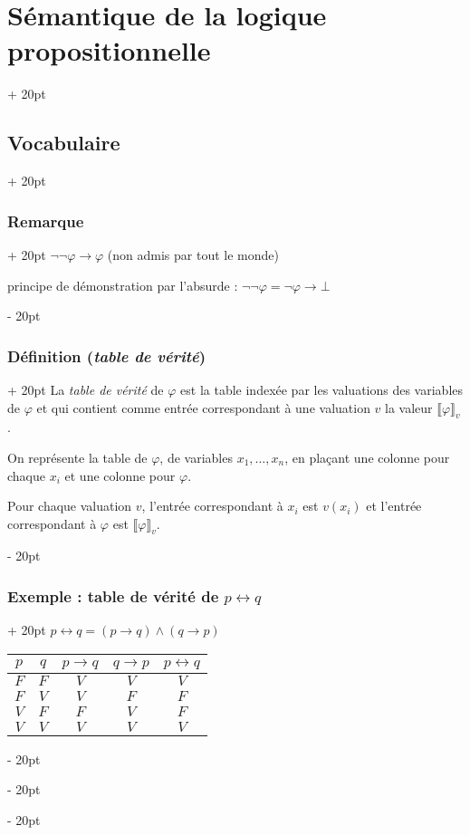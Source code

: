 \documentclass[a4paper, 12pt, twoside]{article}
\newcommand{\ind}[1][20pt]{\advance\leftskip + #1}
\newcommand{\deind}[1][20pt]{\advance\leftskip - #1}
\newenvironment{indt}[2][20pt]{#2 \par \ind[#1]}{\par \deind} %
\begin{document}
\begin{indt}{\section{Sémantique de la logique propositionnelle}}
\begin{indt}{\subsection{Vocabulaire}}
\begin{indt}{\subsubsection{Remarque}}
                $\neg \neg \varphi \rightarrow \varphi$ (non admis par tout le monde)
                
                principe de démonstration par l'absurde : $\neg \neg \varphi = \neg \varphi \rightarrow \bot$
            \end{indt}
            
            \vspace{12pt}
            
            \begin{indt}{\subsubsection{Définition (\textit{table de vérité})}}
                La \textit{table de vérité} de $\varphi$ est la table indexée par les valuations des variables de $\varphi$ et qui contient comme entrée correspondant à une valuation $v$ la valeur $\llbracket \varphi \rrbracket_v$.
                
                On représente la table de $\varphi$, de variables $x_1, \ldots, x_n$, en plaçant une colonne pour chaque $x_i$ et une colonne pour $\varphi$.
                
                Pour chaque valuation $v$, l'entrée correspondant à $x_i$ est $v(x_i)$ et l'entrée correspondant à $\varphi$ est $\llbracket \varphi \rrbracket_v$.
            \end{indt}
            
            \vspace{12pt}
            
            \begin{indt}{\subsubsection{Exemple : table de vérité de $p \leftrightarrow q$}}
                $p \leftrightarrow q = (p \rightarrow q) \wedge (q \rightarrow p)$
                
                \begin{tabular}{c|c|c|c|c}
                    $p$ & $q$ & $p \rightarrow q$ & $q \rightarrow p$ & $p \leftrightarrow q$
                    \\
                    \hline
                    $F$ & $F$ & $V$ & $V$ & $V$
                    \\
                    $F$ & $V$ & $V$ & $F$ & $F$
                    \\
                    $V$ & $F$ & $F$ & $V$ & $F$
                    \\
                    $V$ & $V$ & $V$ & $V$ & $V$
                \end{tabular}
                

\end{indt}
\end{indt}
\end{indt}
\end{document}

